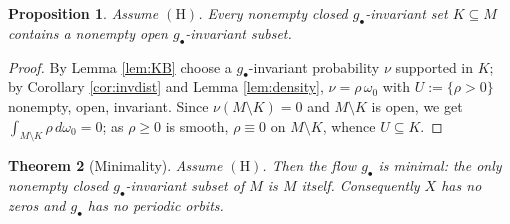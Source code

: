 \documentclass[11pt]{amsart}
\theoremstyle{plain}
\newtheorem{theorem}{Theorem}[section]
\newtheorem{proposition}[theorem]{Proposition}
\theoremstyle{definition}
\theoremstyle{remark}
\begin{document}
\begin{proposition}\label{prop:opensets}
Assume $(\mathrm{H})$. Every nonempty closed $g_\bullet$-invariant set
$K\subseteq M$ contains a nonempty open $g_\bullet$-invariant subset.
\end{proposition}

\begin{proof}
By Lemma \ref{lem:KB} choose a $g_\bullet$-invariant probability $\nu$
supported in $K$; by Corollary \ref{cor:invdist} and Lemma
\ref{lem:density}, $\nu=\rho\,\omega_0$ with $U:=\{\rho>0\}$ nonempty,
open, invariant. Since $\nu(M\setminus K)=0$ and $M\setminus K$ is open,
we get $\int_{M\setminus K}\rho\,d\omega_0=0$; as $\rho\ge0$ is smooth,
$\rho\equiv0$ on $M\setminus K$, whence $U\subseteq K$.
\end{proof}

\begin{theorem}[Minimality]\label{thm:minimal}
Assume $(\mathrm{H})$. Then the flow $g_\bullet$ is minimal: the only
nonempty closed $g_\bullet$-invariant subset of $M$ is $M$ itself.
Consequently $X$ has no zeros and $g_\bullet$ has no periodic orbits.
\end{theorem}
\end{document}

